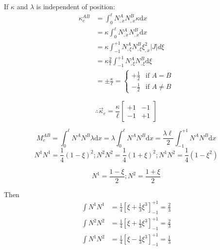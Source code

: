 If $\kappa$ and $\lambda$ is independent of position:
\begin{equation}
\begin{aligned}
	\kappa_e^{AB} &= \int_0^\ell N_{,x}^A N_{,x}^B \kappa \text{d}x \\
&= \kappa \int_0^\ell N_{,x}^A N_{,x}^B \text{d}x \\
&= \kappa \int_{-1}^{+1} N_{,\xi}^A N_{,\xi}^B \xi_{,x}^2 \left|J\right|  d\xi \\
&=\kappa \frac{2}{\ell} \int_{-1}^{+1} N_{,\xi}^A N_{,\xi}^B \text{d}\xi\\
&= \pm \frac{\kappa}{\ell} = \begin{cases}
+\frac{1}{2} & \text{if } A = B \\
-\frac{1}{2} & \text{if } A \ne B
\end{cases}
\end{aligned}
\end{equation}

\begin{equation}
\therefore \vec{\kappa}_e = \frac{\kappa}{\ell} \begin{bmatrix} +1 & -1 \\ -1 & +1 \end{bmatrix}
\end{equation}	

\begin{equation}
M_e^{AB} = \int_0^\ell N^A N^B \lambda \text{d}x = \lambda \int_0^\ell N^A N^B \text{d}x = \frac{\lambda \ell}{2} \int_{-1}^{+1} N^A N^B \text{d}x
\end{equation}
\begin{equation}
N^1 N^1 = \frac{1}{4}(1-\xi)^2 ; N^2 N^2 = \frac{1}{4}(1+\xi)^2 ; N^1 N^2 = \frac{1}{4}(1-\xi^2)
\end{equation}

\begin{equation}
N^1 = \frac{1-\xi}{2} ; N^2 = \frac{1+\xi}{2}
\end{equation}

Then
	\begin{equation}
	\begin{aligned}
	\int N^1 N^1 &= \frac{1}{4} \left[ \xi + \frac{1}{3}\xi^3 \right]_{-1}^{+1} = \frac{2}{3} \\
	\int N^2 N^2 &= \frac{1}{4} \left[ \xi + \frac{1}{3}\xi^3 \right]_{-1}^{+1} = \frac{2}{3} \\
	\int N^1 N^2 &= \frac{1}{4} \left[ \xi - \frac{1}{3}\xi^3 \right]_{-1}^{+1} = \frac{1}{3} \\
	\end{aligned}
	\end{equation}	
	
